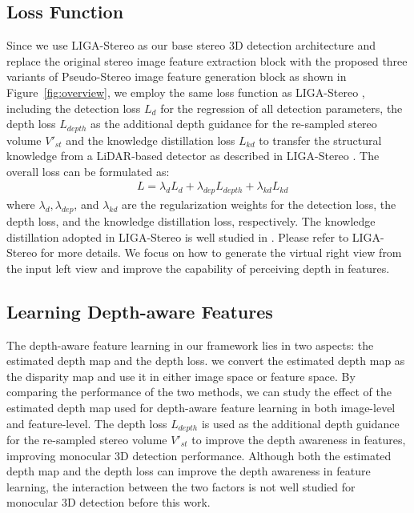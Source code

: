 \documentclass[10pt,twocolumn,letterpaper]{article}
\begin{document}
\subsection{Loss Function}
\label{sec:loss}
Since we use LIGA-Stereo \cite{guo2021liga} as our base stereo 3D detection architecture and replace the original stereo image feature extraction block with the proposed three variants of Pseudo-Stereo image feature generation block as shown in Figure~\ref{fig:overview}, we employ the same loss function as LIGA-Stereo \cite{guo2021liga}, including the detection loss $L_{d}$ for the regression of all detection parameters, the depth loss $L_{depth}$ as the additional depth guidance for the re-sampled stereo volume $V'_{st}$ and the knowledge distillation loss $L_{kd}$ to transfer the structural knowledge from a LiDAR-based detector as described in LIGA-Stereo \cite{guo2021liga}. The overall loss can be formulated as:
\begin{eqnarray}
&L = \lambda _{d}L_{d}+ \lambda _{dep}L_{depth}+\lambda _{kd}L_{kd}
\end{eqnarray}
where $\lambda _{d}, \lambda _{dep}$, and $\lambda _{kd}$ are the regularization weights for the detection loss, the depth loss, and the knowledge distillation loss, respectively. The knowledge distillation adopted in LIGA-Stereo is well studied in \cite{guo2021liga}. Please refer to LIGA-Stereo \cite{guo2021liga} for more details. We focus on how to generate the virtual right view from the input left view and improve the capability of perceiving depth in features.  
\subsection{Learning Depth-aware Features}\label{sec:depth_loss}
The depth-aware feature learning in our framework lies in two aspects: the estimated depth map and the depth loss. we convert the estimated depth map as the disparity map and use it in either image space or feature space. By comparing the performance of the two methods, we can study the effect of the estimated depth map used for depth-aware feature learning in both image-level and feature-level. The depth loss $L_{depth}$ is used as the additional depth guidance for the re-sampled stereo volume $V'_{st}$ to improve the depth awareness in features, improving monocular 3D detection performance. Although both the estimated depth map and the depth loss can improve the depth awareness in feature learning, the interaction between the two factors is not well studied for monocular 3D detection before this work.  
\end{document}
